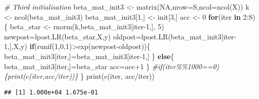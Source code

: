 \documentclass[
]{article}
\newenvironment{Shaded}{\begin{snugshade}}{\end{snugshade}}
\newcommand{\AttributeTok}[1]{\textcolor[rgb]{0.77,0.63,0.00}{#1}}
\newcommand{\CommentTok}[1]{\textcolor[rgb]{0.56,0.35,0.01}{\textit{#1}}}
\newcommand{\ConstantTok}[1]{\textcolor[rgb]{0.00,0.00,0.00}{#1}}
\newcommand{\ControlFlowTok}[1]{\textcolor[rgb]{0.13,0.29,0.53}{\textbf{#1}}}
\newcommand{\DecValTok}[1]{\textcolor[rgb]{0.00,0.00,0.81}{#1}}
\newcommand{\FunctionTok}[1]{\textcolor[rgb]{0.00,0.00,0.00}{#1}}
\newcommand{\NormalTok}[1]{#1}
\newcommand{\OtherTok}[1]{\textcolor[rgb]{0.56,0.35,0.01}{#1}}
\newcommand{\SpecialCharTok}[1]{\textcolor[rgb]{0.00,0.00,0.00}{#1}}
\begin{document}
\begin{Shaded}
\begin{Highlighting}[]
\CommentTok{\# Third initialisation}
\NormalTok{beta\_mat\_init3 }\OtherTok{\textless{}{-}} \FunctionTok{matrix}\NormalTok{(}\ConstantTok{NA}\NormalTok{,}\AttributeTok{nrow=}\NormalTok{S,}\AttributeTok{ncol=}\FunctionTok{ncol}\NormalTok{(X))}
\NormalTok{k }\OtherTok{\textless{}{-}} \FunctionTok{ncol}\NormalTok{(beta\_mat\_init3)}
\NormalTok{beta\_mat\_init3[}\DecValTok{1}\NormalTok{,] }\OtherTok{\textless{}{-}}\NormalTok{ init[}\DecValTok{3}\NormalTok{,]}
\NormalTok{acc }\OtherTok{\textless{}{-}} \DecValTok{0}
\ControlFlowTok{for}\NormalTok{(iter }\ControlFlowTok{in} \DecValTok{2}\SpecialCharTok{:}\NormalTok{S)\{}
\NormalTok{  beta\_star }\OtherTok{\textless{}{-}} \FunctionTok{rnorm}\NormalTok{(k,beta\_mat\_init3[iter}\DecValTok{{-}1}\NormalTok{,], }\DecValTok{5}\NormalTok{)}
\NormalTok{  newpost}\OtherTok{=}\FunctionTok{lpost.LR}\NormalTok{(beta\_star,X,y)}
\NormalTok{  oldpost}\OtherTok{=}\FunctionTok{lpost.LR}\NormalTok{(beta\_mat\_init3[iter}\DecValTok{{-}1}\NormalTok{,],X,y)}
  \ControlFlowTok{if}\NormalTok{(}\FunctionTok{runif}\NormalTok{(}\DecValTok{1}\NormalTok{,}\DecValTok{0}\NormalTok{,}\DecValTok{1}\NormalTok{)}\SpecialCharTok{\textgreater{}}\FunctionTok{exp}\NormalTok{(newpost}\SpecialCharTok{{-}}\NormalTok{oldpost))\{}
\NormalTok{    beta\_mat\_init3[iter,]}\OtherTok{=}\NormalTok{beta\_mat\_init3[iter}\DecValTok{{-}1}\NormalTok{,]}
\NormalTok{  \} }\ControlFlowTok{else}\NormalTok{\{}
\NormalTok{    beta\_mat\_init3[iter,]}\OtherTok{=}\NormalTok{beta\_star}
\NormalTok{    acc}\OtherTok{=}\NormalTok{acc}\SpecialCharTok{+}\DecValTok{1}
\NormalTok{  \}}
  \CommentTok{\#if(iter\%\%1000==0)\{print(c(iter,acc/iter))\}}
\NormalTok{\}}
\FunctionTok{print}\NormalTok{(}\FunctionTok{c}\NormalTok{(iter, acc}\SpecialCharTok{/}\NormalTok{iter))}
\end{Highlighting}
\end{Shaded}

\begin{verbatim}
## [1] 1.000e+04 1.675e-01
\end{verbatim}
\end{document}
